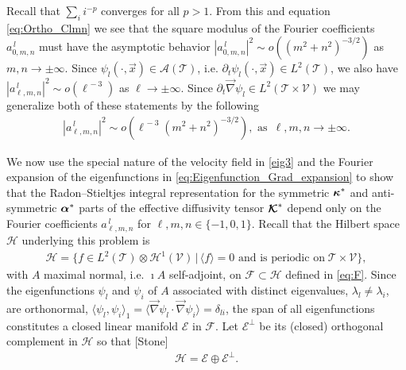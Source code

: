\documentclass{article}
\newcommand\bkappa{\mbox{\boldmath${\kappa}$}}
\newcommand\balpha{\mbox{\boldmath${\alpha}$}}
\newcommand\Kbc{\mbox{\boldmath${\mathcal{K}}$}}
\newcommand{\Hc}{\mathcal{H}}
\newcommand{\Ac}{\mathcal{A}}
\newcommand{\Tc}{\mathcal{T}}
\newcommand{\Vc}{\mathcal{V}}
\newcommand{\Fc}{\mathcal{F}}
\newcommand{\Ec}{\mathcal{E}}
\newcommand{\0}{\mathbf{0}}
\newcommand{\1}{\mathbf{1}}
\newcommand{\2}{\mathbf{2}}
\newcommand{\3}{\mathbf{3}}
\newcommand{\4}{\mathbf{4}}
\newcommand{\5}{\mathbf{5}}
\newcommand{\6}{\mathbf{6}}
\newcommand{\7}{\mathbf{7}}
\newcommand{\8}{\mathbf{8}}
\begin{document}
Recall that $\sum_ii^{-p}$ converges for all $p>1$. From this and
equation \eqref{eq:Ortho_Clmn} we see that the square modulus of the  
Fourier coefficients $a^{\,l}_{0,m,n}$ must have the asymptotic behavior 
$|a^{\,l}_{0,m,n}|^2\sim o((m^2+n^2)^{-3/2})$ as $m,n\to\pm\infty$. Since
$\psi_l(\cdot,\vec{x})\in\Ac(\Tc)$, i.e. $\partial_t\psi_l(\cdot,\vec{x})\in L^2(\Tc)$, we also
have $|a^{\,l}_{\ell,m,n}|^2\sim o(\ell^{\,-3})$ as $\ell\to\pm\infty$. Since
$\partial_t\vec{\nabla}\psi_l\in L^2(\Tc\times\Vc)$ we may generalize 
both of these statements by the following
%
\begin{align}\label{eq:Clmn_assymptotics}
  |a^{\,l}_{\ell,m,n}|^2\sim o(\ell^{\,-3}(m^2+n^2)^{-3/2}), \text{ as } \,\ell,m,n\to\pm\infty.
\end{align}
%



We now use the special nature of the velocity field in \eqref{eig3}
and the Fourier expansion of the eigenfunctions in
\eqref{eq:Eigenfunction_Grad_expansion} to show that the
Radon--Stieltjes integral representation for the symmetric $\bkappa^*$
and anti-symmetric $\balpha^*$ parts of the effective diffusivity
tensor $\Kbc^*$ depend only on the Fourier coefficients
$a^{\,l}_{\ell,m,n}$ for $\ell,m,n\in\{-1,0,1\}$. Recall that the Hilbert space
$\Hc$ underlying this problem is
%
\begin{align}\label{eq:Hilbert_Space}
  \Hc=\{f\in L^2(\Tc)\otimes\Hc^1(\Vc) \,|\, \langle f\rangle=0 \text{ and is periodic on}\; \Tc\times\Vc\}, 
\end{align}
% 
with $A$ maximal normal, i.e. $\imath A$ self-adjoint, on $\Fc\subset\Hc$ defined
in \eqref{eq:F}. Since the eigenfunctions $\psi_l$ and $\psi_i$ of $A$
associated with distinct eigenvalues, $\lambda_l\neq\lambda_i$, are orthonormal,
$\langle\psi_l,\psi_i\rangle_1=\langle\vec{\nabla}\psi_l\cdot\vec{\nabla}\psi_i\rangle=\delta_{li}$, the span of all
eigenfunctions constitutes a closed linear manifold $\Ec$ in
$\Fc$. Let $\Ec^\perp$ be its (closed) orthogonal complement in $\Hc$
so that [Stone]
\begin{align}\label{eq:Hilbert_Space_Decomposition}
  \Hc=\Ec\oplus\Ec^\perp.
\end{align}
%
\end{document}
